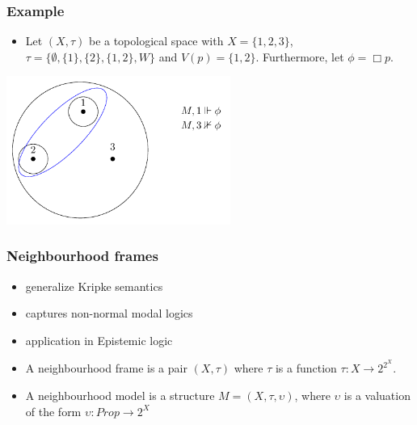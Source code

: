 \documentclass[hyperref={pdfpagelabels=false},t,10pt]{beamer}
\begin{document}
\begin{frame}
  
  \frametitle{Example}
  \begin{itemize}
    \item  Let $(X,\tau)$ be a topological space with 
    $X = \{1,2,3\}$, $\tau = \{\emptyset, \{1\}, \{2\}, \{1,2\}, W\}$ and $V(p) = \{1,2\}$. Furthermore, let $\phi = \Box p$.
    \pause
  \end{itemize}
  \centering
  \includegraphics[width=0.55\textwidth]{Example2.pdf}
\end{frame}


\begin{frame}
  \frametitle{Neighbourhood frames}
  \begin{itemize}
    \item generalize Kripke semantics
    \item captures non-normal modal logics
    \item application in Epistemic logic
    \pause
    \item A neighbourhood frame is a pair $(X, \tau)$ where $\tau$ is a function $\tau : X \rightarrow 2^{2^X}$.
    \item A neighbourhood model is a structure $M = (X, \tau, \upsilon)$, where $\upsilon$ is a valuation of the form $\upsilon : Prop \rightarrow 2^X$
  \end{itemize}
\end{frame}
\end{document}
